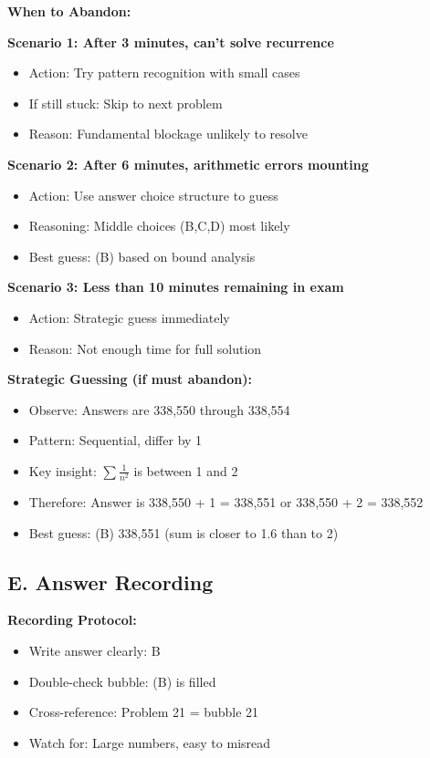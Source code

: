 \documentclass[12pt]{article}
\begin{document}
\begin{competitionbox}
\textbf{When to Abandon:}

\textbf{Scenario 1: After 3 minutes, can't solve recurrence}
\begin{itemize}
    \item Action: Try pattern recognition with small cases
    \item If still stuck: Skip to next problem
    \item Reason: Fundamental blockage unlikely to resolve
\end{itemize}

\textbf{Scenario 2: After 6 minutes, arithmetic errors mounting}
\begin{itemize}
    \item Action: Use answer choice structure to guess
    \item Reasoning: Middle choices (B,C,D) most likely
    \item Best guess: (B) based on bound analysis
\end{itemize}

\textbf{Scenario 3: Less than 10 minutes remaining in exam}
\begin{itemize}
    \item Action: Strategic guess immediately
    \item Reason: Not enough time for full solution
\end{itemize}

\textbf{Strategic Guessing (if must abandon):}
\begin{itemize}
    \item Observe: Answers are 338,550 through 338,554
    \item Pattern: Sequential, differ by 1
    \item Key insight: $\sum \frac{1}{n^2}$ is between 1 and 2
    \item Therefore: Answer is 338,550 + 1 = 338,551 or 338,550 + 2 = 338,552
    \item Best guess: (B) 338,551 (sum is closer to 1.6 than to 2)
\end{itemize}

\subsection*{E. Answer Recording}

\textbf{Recording Protocol:}
\begin{itemize}
    \item Write answer clearly: B
    \item Double-check bubble: (B) is filled
    \item Cross-reference: Problem 21 = bubble 21
    \item Watch for: Large numbers, easy to misread
\end{itemize}


\end{competitionbox}
\end{document}
